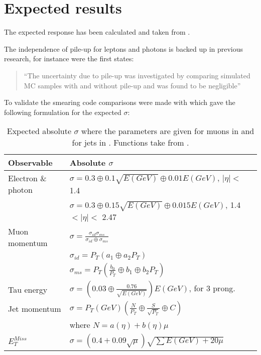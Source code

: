 \section{Expected results}\label{cha:vali:sec:expr}

The expected response has been calculated and taken from \citep{ATL-PHYS-PUB-2013-004}.

The independence of pile-up for leptons and photons is backed up in previous research, for instance \citep{Electronperf:2011, ATLAS:LOI2} were the first states:
\begin{quotation}
``The uncertainty due to pile-up was investigated by comparing simulated MC samples with and without pile-up and was found to be negligible''
\end{quotation}


To validate the smearing code comparisons were made with \citep{ATL-PHYS-PUB-2013-004} which gave the following formulation for the expected $\sigma$: 
\begin{table}[H]
\renewcommand{\arraystretch}{1.5} %
\begin{center}
\begin{tabular}{|l|l|}
\hline
Observable & Absolute $\sigma$ \\ \hline
Electron \& photon & $\sigma=0.3\oplus 0.1\sqrt{E(GeV)}\oplus 0.01E(GeV)$, $|\eta|<$ 1.4 \\
& $\sigma=0.3\oplus 0.15\sqrt{E(GeV)}\oplus 0.015E(GeV)$, 1.4 $<|\eta|<$ 2.47 \\ \hline 
Muon momentum& $\sigma=\frac{\sigma_{id} \sigma_{ms}}{\sigma_{id} \oplus \sigma_{ms}}$\\
& $\sigma_{id}=P_T(a_1 \oplus a_2 P_T)$\\
& $\sigma_{ms}=P_T(\frac{b_0}{P_T} \oplus b_1 \oplus b_2 P_T)$\\ \hline
Tau energy& $\sigma =(0.03\oplus \frac{0.76}{\sqrt{E(GeV)}})E(GeV)$, for 3 prong.\\ \hline
Jet momentum& $\sigma = P_T(GeV)(\frac{N}{P_T} \oplus \frac{S}{\sqrt{P_T}} \oplus C)$ \\ 
& where $N=a(\eta)+b(\eta)\mu$ \\ \hline
$E_T^{Miss}$ & $\sigma = (0.4+0.09\sqrt{\mu})\sqrt{\sum E(GeV)+20\mu}$ \\ \hline
\end{tabular}
\end{center}
\renewcommand{\arraystretch}{1.0} %
\caption{Expected absolute $\sigma$ where the parameters are given for muons in  and for jets in . Functions take from \citep{ATL-PHYS-PUB-2013-004}.}
\label{tab:expected sigma}
\end{table}
